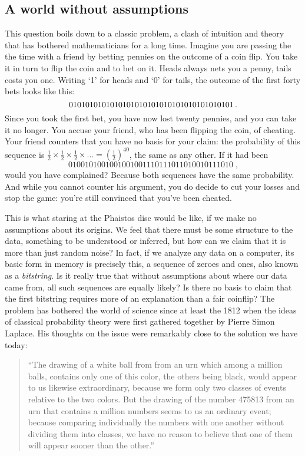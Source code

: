 \subsection*{A world without assumptions}

This question boils down to a classic problem, a clash of intuition and theory that has bothered mathematicians for a long time. Imagine you are passing the the time with a friend by betting pennies on the outcome of a coin flip. You take it in turn to flip the coin and to bet on it. Heads always nets you a penny, tails costs you one. Writing `1' for heads and `0' for tails, the outcome of the first forty bets looks like this:
\[
0101010101010101010101010101010101010101 \,\text{.}
\]   
Since you took the first bet, you have now lost twenty pennies, and you can take it no longer. You accuse your friend, who has been flipping the coin, of cheating. Your friend counters that you have no basis for your claim: the probability of this sequence is $\frac{1}{2} \times \frac{1}{2} \times \frac{1}{2} \times \ldots = \left(\frac{1}{2}\right)^{40}$, the same as any other. If it had been 
\[
0100101001001001001110111011010010111010 \;\text{,}
\]
would you have complained? Because both sequences have the same probability. And while you cannot counter his argument, you do decide to cut your losses and stop the game: you're still convinced that you've been cheated.

This is what staring at the Phaistos disc would be like, if we make no assumptions about its origins. We feel that there must be some structure  to the data, something to be understood or inferred, but how can we claim that it is more than just random noise? In fact, if we analyze any data on a computer, its basic form in memory is precisely this, a sequence of zeroes and ones, also known as a \emph{bitstring}. Is it really true that without assumptions about where our data came from, all such sequences are equally likely? Is there no basis to claim that the first bitstring requires more of an explanation than a fair coinflip? The problem has bothered the world of science since at least the 1812 when the ideas of classical probability theory were first gathered together by Pierre Simon Laplace. His thoughts on the issue were remarkably close to the solution we have today:


\begin{quote}
``The drawing of a white ball from from an urn which among a million balls, contains only one of this color, the others being black, would appear to us likewise extraordinary, because we form only two classes of events relative to the two colors. But the drawing of the number 475813 from an urn that contains a million numbers seems to us an ordinary event; because comparing individually the numbers with one another without dividing them into classes, we have no reason to believe that one of them will appear sooner than the other.'' \cite{laplace1951philosophical}
\end{quote}

